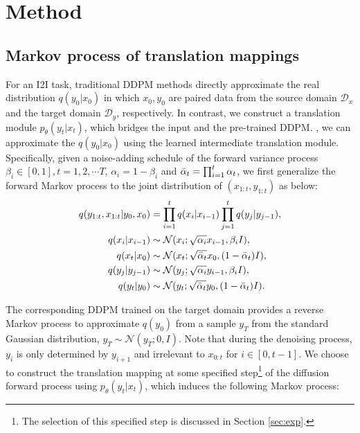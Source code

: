 \section{Method}\label{sec:method}

\subsection{Markov process of translation mappings}\label{subsec:Markov_Process}

For an I2I task, traditional DDPM methods directly approximate the real distribution $q(y_0|x_0)$ in which $x_0, y_0$ are paired data from the source domain ${\mathcal D}_x$ and the target domain ${\mathcal D}_y$, respectively.
%
In contrast, we construct a translation module $p_{\theta}(y_t|x_t)$, which bridges the input  and the pre-trained DDPM.
%
, we can approximate the $q(y_0|x_0)$ using the learned intermediate translation module.
%
Specifically, given a noise-adding schedule of the forward variance process $\beta_i\in[0,1],t=1,2,\cdots T$, $\alpha_i=1-\beta_i$ and $\bar{\alpha}_{t}=\prod_{i=1}^t\alpha_t$, we first generalize the forward Markov process to the joint distribution of $(x_{1:t}, y_{1:t})$ as below:
%
\begin{align}
q(y_{1:t},x_{1:t}|y_0, x_0)& =\prod_{i=1}^t q(x_i|x_{i-1})\prod_{j=1}^t q(y_j|y_{j-1}), \label{eq:3.1} \\
q(x_i|x_{i-1})& \sim\mathcal N(x_i;\sqrt{\alpha_i}x_{i-1},\beta_i I), \\
q(x_t|x_0)& \sim\mathcal N(x_t;\sqrt{\bar{\alpha}_{t}}x_0,(1-\bar{\alpha}_{t}) I), \\
q(y_j|y_{j-1})& \sim\mathcal N(y_j;\sqrt{\alpha_i}y_{i-1},\beta_i I), \\
q(y_t|y_0)& \sim\mathcal N(y_t;\sqrt{\bar{\alpha}_{t}}y_0,(1-\bar{\alpha}_{t}) I).
\end{align}

The corresponding DDPM trained on the target domain provides a reverse Markov process to approximate $q(y_0)$ from a sample $y_T$  from the standard Gaussian distribution,  $y_T\sim\mathcal N(y_T;0,I)$.
%
Note that during the denoising process, $y_i$ is only determined by $y_{i+1}$ and irrelevant to $x_{0:t}$ for $i\in[0,t-1]$. We choose to construct the translation mapping at some specified step\footnote{The selection of this specified step is discussed in Section \ref{sec:exp}.} of the diffusion forward process using $p_{\theta}(y_t|x_t)$, which induces the following Markov process:
%

